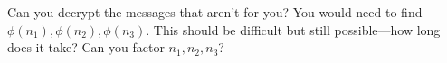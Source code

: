 \documentclass[12pt]{exam}
\begin{document}
\begin{questions}
  \question Can you decrypt the messages that aren't for you? You would need to find $\phi(n_1),\phi(n_2),\phi(n_3)$. This should be difficult but still possible---how long does it take? Can you factor $n_1,n_2,n_3$?
\end{questions}
\end{document}
